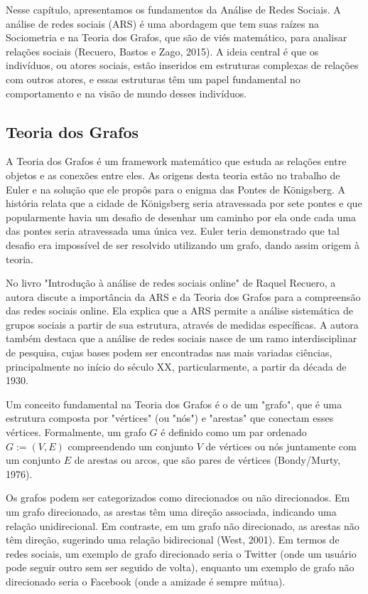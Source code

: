 Nesse capítulo, apresentamos os fundamentos da Análise de Redes Sociais. A análise de redes sociais (ARS) é uma abordagem que tem suas raízes na Sociometria e na Teoria dos Grafos, que são de viés matemático, para analisar relações sociais (Recuero, Bastos e Zago, 2015). A ideia central é que os indivíduos, ou atores sociais, estão inseridos em estruturas complexas de relações com outros atores, e essas estruturas têm um papel fundamental no comportamento e na visão de mundo desses indivíduos.

\subsection{Teoria dos Grafos}
A Teoria dos Grafos é um framework matemático que estuda as relações entre objetos e as conexões entre eles. As origens desta teoria estão no trabalho de Euler e na solução que ele propôs para o enigma das Pontes de Königsberg. A história relata que a cidade de Königsberg seria atravessada por sete pontes e que popularmente havia um desafio de desenhar um caminho por ela onde cada uma das pontes seria atravessada uma única vez. Euler teria demonstrado que tal desafio era impossível de ser resolvido utilizando um grafo, dando assim origem à teoria.

No livro "Introdução à análise de redes sociais online" de Raquel Recuero, a autora discute a importância da ARS e da Teoria dos Grafos para a compreensão das redes sociais online. Ela explica que a ARS permite a análise sistemática de grupos sociais a partir de sua estrutura, através de medidas específicas. A autora também destaca que a análise de redes sociais nasce de um ramo interdisciplinar de pesquisa, cujas bases podem ser encontradas nas mais variadas ciências, principalmente no início do século XX, particularmente, a partir da década de 1930.

Um conceito fundamental na Teoria dos Grafos é o de um "grafo", que é uma estrutura composta por "vértices" (ou "nós") e "arestas" que conectam esses vértices. Formalmente, um grafo $G$ é definido como um par ordenado $G := (V, E)$ compreendendo um conjunto $V$ de vértices ou nós juntamente com um conjunto $E$ de arestas ou arcos, que são pares de vértices (Bondy/Murty, 1976).

Os grafos podem ser categorizados como direcionados ou não direcionados. Em um grafo direcionado, as arestas têm uma direção associada, indicando uma relação unidirecional. Em contraste, em um grafo não direcionado, as arestas não têm direção, sugerindo uma relação bidirecional (West, 2001). Em termos de redes sociais, um exemplo de grafo direcionado seria o Twitter (onde um usuário pode seguir outro sem ser seguido de volta), enquanto um exemplo de grafo não direcionado seria o Facebook (onde a amizade é sempre mútua).

